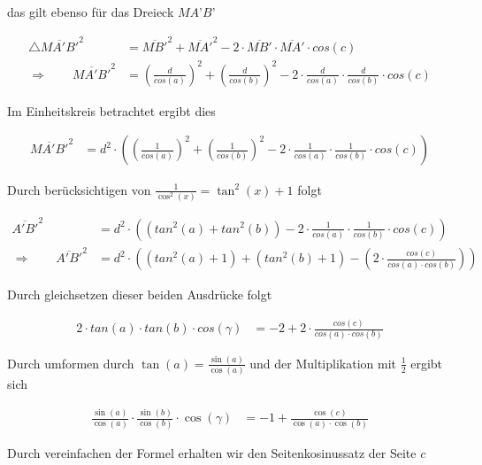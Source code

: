 \begin{refsection}
das gilt ebenso für das Dreieck $MA’B’$

\begin{align*}
\triangle \overline{ MA'B' }^{ 2 } &= \overline{ MB' }^{ 2 } + \overline{ MA' }^{ 2 } - 2\cdot \overline{ MB'} \cdot \overline{ MA' } \cdot cos(c) \\
\Rightarrow \quad \quad
\overline{ MA'B'}^{ 2 } &= \left(\frac{ d }{ cos(a) }  \right)^{ 2 } + \left(\frac{ d }{ cos(b)}  \right)^{ 2 } - 2 \cdot \frac{ d }{ cos(a)} \cdot \frac{ d }{ cos(b)} \cdot cos(c)
\end{align*}


Im Einheitskreis betrachtet ergibt dies

\begin{align*}
\overline{ MA'B' }^{ 2 } &= d^{ 2 } \cdot \left(\left(\frac{ 1 }{ cos(a) }  \right)^{ 2 } + \left(\frac{ 1 }{ cos(b) }  \right)^{ 2 } - 2 \cdot \frac{ 1 }{ cos(a)} \cdot \frac{ 1 }{ cos(b)} \cdot cos(c)\right)
\end{align*}


Durch berücksichtigen von $\frac{1}{\cos^{2}(x)}=\tan^{2}(x)+1$ folgt

\begin{align*}
\overline{ A'B'}^{ 2 } &= d^{ 2 } \cdot \left(\left(tan^{ 2 }(a) + tan^{ 2 }(b)\right) - 2 \cdot \frac{ 1 }{ cos(a)} \cdot \frac{ 1 }{ cos(b)} \cdot cos(c)\right) \\
\Rightarrow \quad \quad
\overline{ A'B'}^{ 2 } &= d^{ 2 } \cdot \left(\left(tan^{ 2 }(a) + 1\right) + \left(tan^{ 2 }(b) + 1\right) - \left(2 \cdot \frac{cos(c)}{cos(a) \cdot cos(b)}\right)\right)
\end{align*}


Durch gleichsetzen dieser beiden Ausdrücke folgt

\begin{align*}
2 \cdot tan(a) \cdot tan(b) \cdot cos(\gamma) &= -2+2 \cdot \frac{cos(c)}{cos(a) \cdot cos(b)}
\end{align*}

Durch umformen durch $\tan(a)=\frac{\sin(a)}{\cos(a)}$ und der Multiplikation mit  $\frac{1}{2}$ ergibt sich

\begin{align*}
\frac{\sin(a)}{\cos(a)} \cdot \frac{\sin(b)}{\cos(b)} \cdot \cos(\gamma) &= -1 + \frac{\cos(c)}{\cos(a) \cdot \cos(b)}
\end{align*}

Durch vereinfachen der Formel erhalten wir den Seitenkosinussatz der Seite $c$


\end{refsection}
